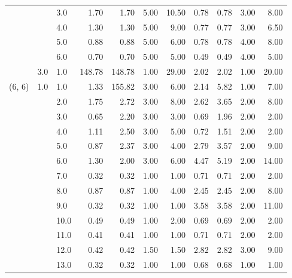 \begin{tabular}{lllrrrrrrrr}
       &     & 3.0  &       1.70 &      1.70 &  5.00 &  10.50 &       0.78 &      0.78 &  3.00 &   8.00 \\
       &     & 4.0  &       1.30 &      1.30 &  5.00 &   9.00 &       0.77 &      0.77 &  3.00 &   6.50 \\
       &     & 5.0  &       0.88 &      0.88 &  5.00 &   6.00 &       0.78 &      0.78 &  4.00 &   8.00 \\
       &     & 6.0  &       0.70 &      0.70 &  5.00 &   5.00 &       0.49 &      0.49 &  4.00 &   5.00 \\
       & 3.0 & 1.0  &     148.78 &    148.78 &  1.00 &  29.00 &       2.02 &      2.02 &  1.00 &  20.00 \\
(6, 6) & 1.0 & 1.0  &       1.33 &    155.82 &  3.00 &   6.00 &       2.14 &      5.82 &  1.00 &   7.00 \\
       &     & 2.0  &       1.75 &      2.72 &  3.00 &   8.00 &       2.62 &      3.65 &  2.00 &   8.00 \\
       &     & 3.0  &       0.65 &      2.20 &  3.00 &   3.00 &       0.69 &      1.96 &  2.00 &   2.00 \\
       &     & 4.0  &       1.11 &      2.50 &  3.00 &   5.00 &       0.72 &      1.51 &  2.00 &   2.00 \\
       &     & 5.0  &       0.87 &      2.37 &  3.00 &   4.00 &       2.79 &      3.57 &  2.00 &   9.00 \\
       &     & 6.0  &       1.30 &      2.00 &  3.00 &   6.00 &       4.47 &      5.19 &  2.00 &  14.00 \\
       &     & 7.0  &       0.32 &      0.32 &  1.00 &   1.00 &       0.71 &      0.71 &  2.00 &   2.00 \\
       &     & 8.0  &       0.87 &      0.87 &  1.00 &   4.00 &       2.45 &      2.45 &  2.00 &   8.00 \\
       &     & 9.0  &       0.32 &      0.32 &  1.00 &   1.00 &       3.58 &      3.58 &  2.00 &  11.00 \\
       &     & 10.0 &       0.49 &      0.49 &  1.00 &   2.00 &       0.69 &      0.69 &  2.00 &   2.00 \\
       &     & 11.0 &       0.41 &      0.41 &  1.00 &   1.00 &       0.71 &      0.71 &  2.00 &   2.00 \\
       &     & 12.0 &       0.42 &      0.42 &  1.50 &   1.50 &       2.82 &      2.82 &  3.00 &   9.00 \\
       &     & 13.0 &       0.32 &      0.32 &  1.00 &   1.00 &       0.68 &      0.68 &  1.00 &   1.00 \\

\end{tabular}
